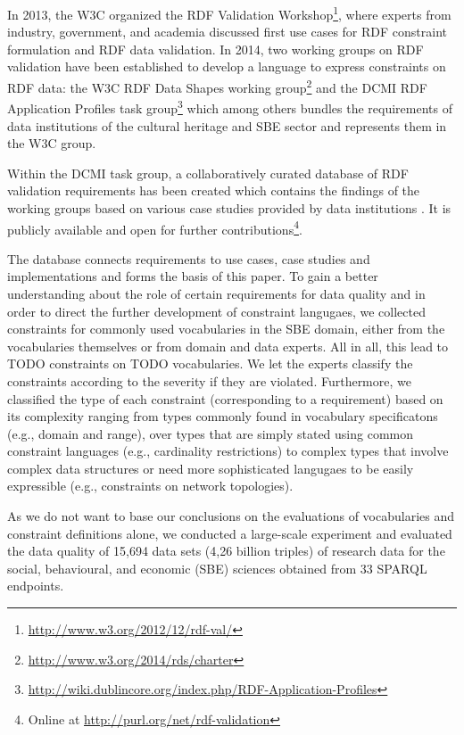 \documentclass{llncs}
\newcommand{\ke}[1]{\todo[size=\small, color=red!40]{\textbf{Kai:} #1}}
\begin{document}
In 2013, the W3C organized the RDF Validation Workshop\footnote{\url{http://www.w3.org/2012/12/rdf-val/}}, 
where experts from industry, government, and academia discussed first use cases for RDF constraint formulation and RDF data validation.
In 2014, two working groups on RDF validation have been established to develop a language to express constraints on RDF data: 
the W3C RDF Data Shapes working group\footnote{\url{http://www.w3.org/2014/rds/charter}} and the DCMI RDF Application Profiles task group\footnote{\url{http://wiki.dublincore.org/index.php/RDF-Application-Profiles}} which among others bundles the requirements of data institutions of the cultural heritage and SBE sector and represents them in the W3C group. 

Within the DCMI task group, a collaboratively curated database of RDF validation requirements has been created which contains the findings of the working groups based on various case studies provided by data institutions \cite{BoschEckert2014}. It is publicly available and open for further contributions\footnote{Online at \url{http://purl.org/net/rdf-validation}}.

The database connects requirements to use cases, case studies and implementations and forms the basis of this paper. To gain a better understanding about the role of certain requirements for data quality and in order to direct the further development of constraint langugaes, we collected constraints for commonly used vocabularies in the SBE domain, either from the vocabularies themselves or from domain and data experts. All in all, this lead to TODO constraints on TODO vocabularies. We let the experts classify the constraints according to the severity if they are violated. Furthermore, we classified the type of each constraint (corresponding to a requirement) based on its complexity ranging from types commonly found in vocabulary specificatons (e.g., domain and range), over types that are simply stated using common constraint languages (e.g., cardinality restrictions) to complex types that involve complex data structures or need more sophisticated langugaes to be easily expressible (e.g., constraints on network topologies).\ke{Thomas: Ok so?}

As we do not want to base our conclusions on the evaluations of vocabularies and constraint definitions alone, we conducted a large-scale experiment and evaluated the data quality of 15,694 data sets (4,26 billion triples) of research data for the social, behavioural, and economic (SBE) sciences obtained from 33 SPARQL endpoints.
\end{document}
